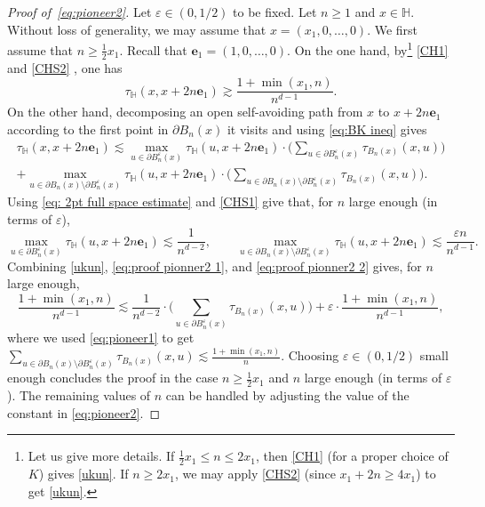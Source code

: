 \documentclass[11pt,a4paper]{article}
\numberwithin{equation}{section}
\theoremstyle{plain}
\theoremstyle{definition}
\begin{document}
\begin{proof}[Proof of~\eqref{eq:pioneer2}] Let $\varepsilon\in (0,1/2)$ to be fixed. Let $n \geq 1$ and $x\in \mathbb H$. Without loss of generality, we may assume that $x=(x_1,0,\ldots,0)$. We first assume that $n\geq \tfrac{1}{2}x_1$. Recall that $\mathbf{e}_1=(1,0,\ldots,0)$. On the one hand, by\footnote{Let us give more details. If $\tfrac{1}{2}x_1\leq n \leq 2x_1$, then \eqref{CH1} (for a proper choice of $K$) gives \eqref{ukun}. If $n\geq 2x_1$, we may apply \eqref{CHS2} (since $x_1+2n\geq 4x_1$) to get \eqref{ukun}.} \eqref{CH1} and \eqref{CHS2} , one has  
\begin{equation}\label{ukun}
\tau_{\mathbb H}(x,x+2n\mathbf{e}_1) \gtrsim \frac{ 1+\min(x_1,n)}{n^{d-1}}. 
\end{equation}
On the other hand, decomposing an open self-avoiding path from $x$ to $x+2n\mathbf{e}_1$ according to the first point in $\partial B_n(x)$ it visits and using \eqref{eq:BK ineq} gives
\begin{multline}\label{eq:proof pionner2 1}
\tau_{\mathbb H}(x,x+2n\mathbf{e}_1)  \lesssim \max_{u\in \partial B_n^\varepsilon(x)}\tau_{\mathbb H}(u,x+2n\mathbf{e}_1) \cdot \Big(\sum_{u\in \partial B_n^\varepsilon(x)} \tau_{B_n(x)}(x,u)\Big) \\+ \max_{u\in \partial B_n(x)\setminus \partial B_n^\varepsilon(x)}\tau_{\mathbb H}(u,x+2n\mathbf{e}_1) \cdot \Big( \sum_{u \in \partial B_n(x) \setminus \partial B_n^\varepsilon(x)}\tau_{B_n(x)}(x,u)\Big).
\end{multline} 
Using \eqref{eq: 2pt full space estimate} and \eqref{CHS1} give that, for $n$ large enough (in terms of $\varepsilon$),
\begin{equation}\label{eq:proof pionner2 2}
	\max_{u\in \partial B_n^\varepsilon(x)}\tau_{\mathbb H}(u,x+2n\mathbf{e}_1)\lesssim \frac{1}{n^{d-2}}, \qquad \max_{u\in \partial B_n(x)\setminus \partial B_n^\varepsilon(x)}\tau_{\mathbb H}(u,x+2n\mathbf{e}_1)\lesssim \frac{\varepsilon n}{n^{d-1}}.
\end{equation}
Combining \eqref{ukun}, \eqref{eq:proof pionner2 1}, and \eqref{eq:proof pionner2 2} gives, for $n$ large enough,
\begin{equation}
	\frac{ 1+\min(x_1,n)}{n^{d-1}}\lesssim \frac{1}{n^{d-2}}\cdot \Big(\sum_{u\in \partial B_n^\varepsilon(x)} \tau_{B_n(x)}(x,u)\Big)+\varepsilon\cdot \frac{ 1+\min(x_1,n)}{n^{d-1}},
\end{equation}
where we used \eqref{eq:pioneer1} to get $\sum_{u \in \partial B_n(x) \setminus \partial B_n^\varepsilon(x)}\tau_{B_n(x)}(x,u)\lesssim \frac{ 1+\min(x_1,n)}{n^{}} $. Choosing $\varepsilon\in(0,1/2)$ small enough concludes the proof in the case $n\geq \tfrac{1}{2}x_1$ and $n$ large enough (in terms of $\varepsilon$). The remaining values of $n$ can be handled by adjusting the value of the constant in \eqref{eq:pioneer2}.


\end{proof}
\end{document}
